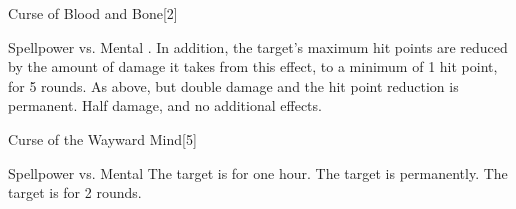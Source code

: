 \begin{spellsection}{Curse of Blood and Bone}[2]
    \begin{spellheader}
    \end{spellheader}
    \begin{spellcontent}
        \begin{spelltargetinginfo}
        \end{spelltargetinginfo}
        \begin{spelleffects}
            \begin{spellattack}{Spellpower vs. Mental}
                \spellsuccess {}. In addition, the target's maximum hit points are reduced by the amount of damage it takes from this effect, to a minimum of 1 hit point, for 5 rounds.
                \spellcritical As above, but double damage and the hit point reduction is permanent.
                \spellfailure Half damage, and no additional effects.
            \end{spellattack}
        \end{spelleffects}
    \end{spellcontent}
    \begin{spellfooter}
        \spellnotes \cursespellnotes
        \miscastrandom
    \end{spellfooter}
    \begin{spellaugments}
    \end{spellaugments}
\end{spellsection}

\begin{spellsection}{Curse of the Wayward Mind}[5]
    \begin{spellheader}
    \end{spellheader}
    \begin{spellcontent}
        \begin{spelltargetinginfo}
        \end{spelltargetinginfo}
        \begin{spelleffects}
            \begin{spellattack}{Spellpower vs. Mental}
                \spellsuccess The target is \disoriented for one hour.
                \spellcritical The target is \disoriented permanently.
                \spellfailure The target is \disoriented for 2 rounds.
            \end{spellattack}
        \end{spelleffects}
    \end{spellcontent}
    \begin{spellfooter}
        \spellnotes \cursespellnotes
        \miscastrandom
    \end{spellfooter}
\end{spellsection}


